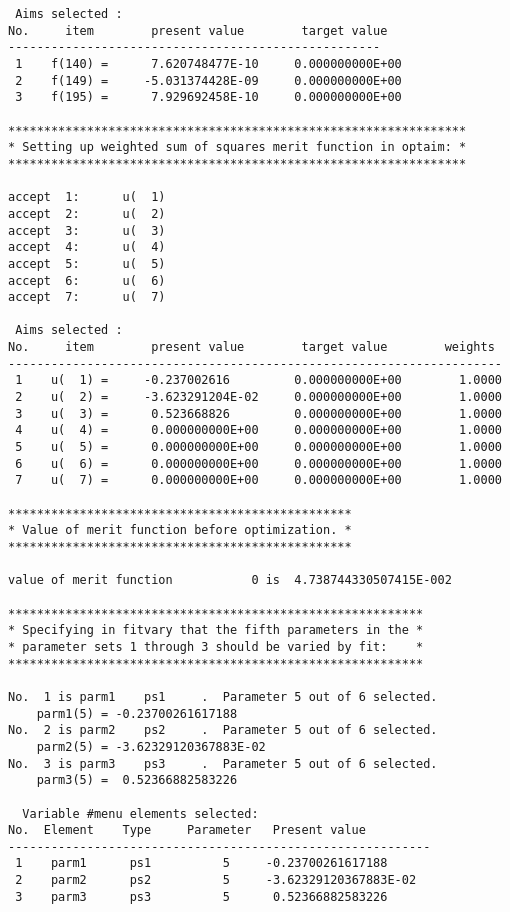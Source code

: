 \begin{footnotesize}
\begin{verbatim}
 Aims selected :
No.     item        present value        target value
----------------------------------------------------
 1    f(140) =      7.620748477E-10     0.000000000E+00
 2    f(149) =     -5.031374428E-09     0.000000000E+00
 3    f(195) =      7.929692458E-10     0.000000000E+00

****************************************************************
* Setting up weighted sum of squares merit function in optaim: *
****************************************************************

accept  1:      u(  1)
accept  2:      u(  2)
accept  3:      u(  3)
accept  4:      u(  4)
accept  5:      u(  5)
accept  6:      u(  6)
accept  7:      u(  7)

 Aims selected :
No.     item        present value        target value        weights
---------------------------------------------------------------------
 1    u(  1) =     -0.237002616         0.000000000E+00        1.0000
 2    u(  2) =     -3.623291204E-02     0.000000000E+00        1.0000
 3    u(  3) =      0.523668826         0.000000000E+00        1.0000
 4    u(  4) =      0.000000000E+00     0.000000000E+00        1.0000
 5    u(  5) =      0.000000000E+00     0.000000000E+00        1.0000
 6    u(  6) =      0.000000000E+00     0.000000000E+00        1.0000
 7    u(  7) =      0.000000000E+00     0.000000000E+00        1.0000

************************************************
* Value of merit function before optimization. *
************************************************

value of merit function           0 is  4.738744330507415E-002

**********************************************************
* Specifying in fitvary that the fifth parameters in the *
* parameter sets 1 through 3 should be varied by fit:    *
**********************************************************

No.  1 is parm1    ps1     .  Parameter 5 out of 6 selected.
    parm1(5) = -0.23700261617188
No.  2 is parm2    ps2     .  Parameter 5 out of 6 selected.
    parm2(5) = -3.62329120367883E-02
No.  3 is parm3    ps3     .  Parameter 5 out of 6 selected.
    parm3(5) =  0.52366882583226

  Variable #menu elements selected:
No.  Element    Type     Parameter   Present value
-----------------------------------------------------------
 1    parm1      ps1          5     -0.23700261617188
 2    parm2      ps2          5     -3.62329120367883E-02
 3    parm3      ps3          5      0.52366882583226


\end{verbatim}
\end{footnotesize}
